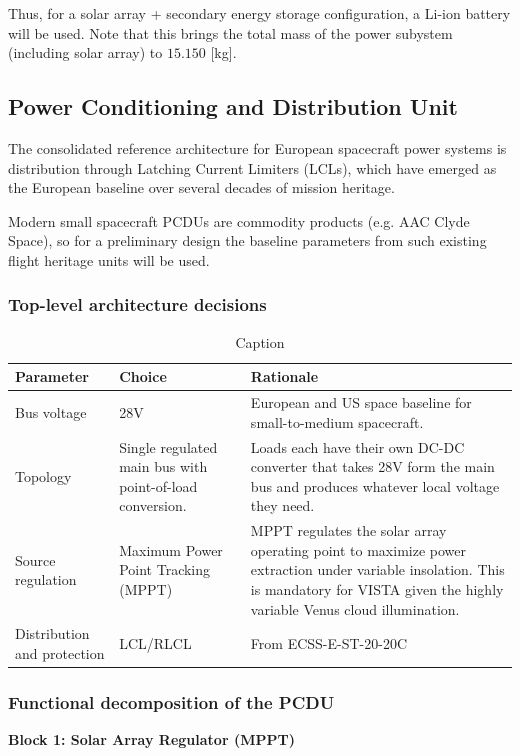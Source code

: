 Thus, for a solar array + secondary energy storage configuration, a Li-ion battery will be used. Note that this brings the total mass of the power subystem (including solar array) to $15.150$ [kg].

\subsection{Power Conditioning and Distribution Unit}
The consolidated reference architecture for European spacecraft power systems is distribution through Latching Current Limiters (LCLs), which have emerged as the European baseline over several decades of mission heritage.

Modern small spacecraft PCDUs are commodity products (e.g. AAC Clyde Space), so for a preliminary design the baseline parameters from such existing flight heritage units will be used.

\subsubsection{Top-level architecture decisions}

\begin{table}
    \centering
    \small
    \begin{tabular}{|p{2.5cm}|p{5cm}|p{7cm}|}
        \hline
         Parameter  & Choice & Rationale\\
        \hline
        Bus voltage & 28V &European and US space baseline for small-to-medium spacecraft. \\
        Topology &Single regulated main bus with point-of-load conversion.  &Loads each have their own DC-DC converter that takes 28V form the main bus and produces whatever local voltage they need. \\
        Source regulation &Maximum Power Point Tracking (MPPT)  &MPPT regulates the solar array operating point to maximize power extraction under variable insolation. This is mandatory for VISTA given the highly variable Venus cloud illumination. \\
        Distribution and protection &LCL/RLCL  &From ECSS-E-ST-20-20C \\
        \hline
    \end{tabular}
    \caption{Caption}
    \label{tab:placeholder}
\end{table}


\subsubsection{Functional decomposition of the PCDU}

\textbf{Block 1: Solar Array Regulator (MPPT)}



